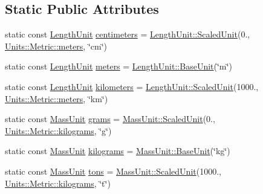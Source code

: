 \subsection*{Static Public Attributes}
\begin{DoxyCompactItemize}
\item 
static const \hyperlink{_quantity_8h_afb62d6d68e6cd2c62c96aa8c3aeb7d1f}{Length\+Unit} \hyperlink{class_units_1_1_metric_a74dbbff37b76b1265ad6ca64168798b0}{centimeters} = \hyperlink{class_unit_aa44ac3044c0cdb834cd220652e5d1c40}{Length\+Unit\+::\+Scaled\+Unit}(0., \hyperlink{class_units_1_1_metric_a74b4e02c4b56750866bb289784d964ba}{Units\+::\+Metric\+::meters}, \char`\"{}cm\char`\"{})
\item 
static const \hyperlink{_quantity_8h_afb62d6d68e6cd2c62c96aa8c3aeb7d1f}{Length\+Unit} \hyperlink{class_units_1_1_metric_a74b4e02c4b56750866bb289784d964ba}{meters} = \hyperlink{class_unit_aa2102921ecd21d9938707db58e4df964}{Length\+Unit\+::\+Base\+Unit}(\char`\"{}m\char`\"{})
\item 
static const \hyperlink{_quantity_8h_afb62d6d68e6cd2c62c96aa8c3aeb7d1f}{Length\+Unit} \hyperlink{class_units_1_1_metric_a75f22b48abbb71b6fa08adf183565a9a}{kilometers} = \hyperlink{class_unit_aa44ac3044c0cdb834cd220652e5d1c40}{Length\+Unit\+::\+Scaled\+Unit}(1000., \hyperlink{class_units_1_1_metric_a74b4e02c4b56750866bb289784d964ba}{Units\+::\+Metric\+::meters}, \char`\"{}km\char`\"{})
\item 
static const \hyperlink{_quantity_8h_a2dde25127542e6a5fcf7c085269b8963}{Mass\+Unit} \hyperlink{class_units_1_1_metric_a88cdf60341e6f6d7013018cdc1c26ec6}{grams} = \hyperlink{class_unit_aa44ac3044c0cdb834cd220652e5d1c40}{Mass\+Unit\+::\+Scaled\+Unit}(0., \hyperlink{class_units_1_1_metric_a99628d80b8989197ae87ed949d06a89a}{Units\+::\+Metric\+::kilograms}, \char`\"{}g\char`\"{})
\item 
static const \hyperlink{_quantity_8h_a2dde25127542e6a5fcf7c085269b8963}{Mass\+Unit} \hyperlink{class_units_1_1_metric_a99628d80b8989197ae87ed949d06a89a}{kilograms} = \hyperlink{class_unit_aa2102921ecd21d9938707db58e4df964}{Mass\+Unit\+::\+Base\+Unit}(\char`\"{}kg\char`\"{})
\item 
static const \hyperlink{_quantity_8h_a2dde25127542e6a5fcf7c085269b8963}{Mass\+Unit} \hyperlink{class_units_1_1_metric_a6795221af474ecd8907538c4ee3505ca}{tons} = \hyperlink{class_unit_aa44ac3044c0cdb834cd220652e5d1c40}{Mass\+Unit\+::\+Scaled\+Unit}(1000., \hyperlink{class_units_1_1_metric_a99628d80b8989197ae87ed949d06a89a}{Units\+::\+Metric\+::kilograms}, \char`\"{}t\char`\"{})

\end{DoxyCompactItemize}
